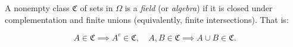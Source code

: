 A nonempty class $\mathfrak{C}$ of sets in $\Omega$ is a \textit{field} (or \textit{algebra}) if it is closed under complementation and finite unions (equivalently, finite intersections). That is:

$$A \in \mathfrak{C} \implies A^c \in \mathfrak{C}, \quad A, B \in \mathfrak{C} \implies A \cup B \in \mathfrak{C}.$$
